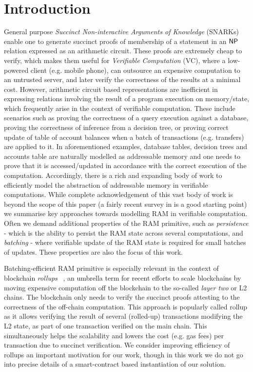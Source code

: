 \documentclass[sigconf]{acmart}
\begin{document}
\section{Introduction}\label{sec:introduction}
General purpose {\em Succinct Non-interactive Arguments of Knowledge} (SNARKs) enable one to generate succinct
proofs of membership of a statement in an $\mathsf{NP}$ relation expressed as an arithmetic circuit. These proofs are
extremely cheap to verify, which makes them useful for {\em Verifiable Computation} (VC), where a low-powered
client (e.g. mobile phone), can outsource an expensive computation to an untrusted server, and later
verify the correctness of the results at a minimal cost.
However,
arithmetic circuit based representations are inefficient in expressing relations involving the result of
a program execution on memory/state, which frequently arise in the context of verifiable computation.
These include scenarios such as proving the correctness of a query execution against a database,
proving the correctness of inference
from a decision tree, or proving correct update of table of account balances when a batch of transactions (e.g. transfers)
are applied to it.
In aforementioned examples, database tables, decision trees and accounts table are naturally
modelled as addressable memory and one needs to prove that it is accessed/updated in accordance with the correct execution
of the computation. Accordingly, there is a rich and expanding body of work to efficiently model the abstraction of
addressable memory in verifiable computations. While complete acknowledgement of this vast body of work is beyond
the scope of this paper (a fairly recent survey in \cite{WB15} is a good starting point) we summarise key approaches towards
modelling RAM in verifiable computation. Often we demand additional properties of the RAM primitive, such as
{\em persistence} - which is the ability to persist the RAM state across several computations, and {\em batching} -
where verifiable update of the RAM state is required for small batches of updates. These properties are also
the focus of this work.

Batching-efficient RAM primitive is especially relevant in the context of blockchain {\em rollups} ~\cite{rollup},
an umbrella term for recent efforts to scale blockchains
by moving expensive computation off the blockchain to the so-called {\em layer two} or L2 chains. The blockchain
only needs to verify the succinct proofs attesting to the correctness of the off-chain computation. This approach
is popularly called rollup as it allows verifying the result of several (rolled-up) transactions
modifying the L2 state, as part of one transaction verified on the main chain.
This simultaneously helps the scalability and lowers the cost (e.g. gas fees)
per transaction due to succinct verification.
We consider improving efficiency of rollups an important
motivation for our work, though in this work we do not go into precise details of a smart-contract based
instantiation of our solution.
\end{document}

